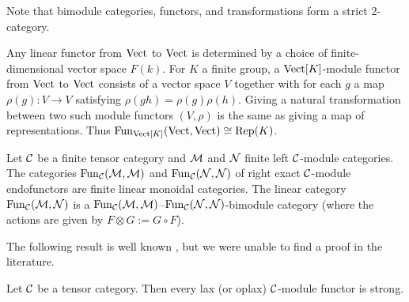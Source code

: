 \documentclass{amsart}
\begin{document}
%
\nid Note that bimodule categories, functors, and transformations form a strict 2-category.  %
 
 


\begin{example}
Any linear functor from $\mathrm{Vect}$ to $\mathrm{Vect}$ is determined by a choice of finite-dimensional vector space $F(k)$.  For $K$ a finite group, a $\mathrm{Vect}[K]$-module functor from $\mathrm{Vect}$ to $\mathrm{Vect}$ consists of a vector space $V$ together with for each $g$ a map $\rho(g): V \rightarrow V$ satisfying $\rho(gh) = \rho(g)\rho(h)$.  Giving a natural transformation between two such module functors $(V, \rho)$ is the same as giving a map of representations.  Thus $\operatorname{Fun}_{\mathrm{Vect}[K]}(\mathrm{Vect}, \mathrm{Vect}) \cong \mathrm{Rep}(K)$.
\end{example}

\begin{example}
	Let $\mathcal C$ be a finite tensor category and $\mathcal M$ and $\mathcal N$ finite left $\mathcal C$-module categories. The categories $\operatorname{Fun}_{\mathcal C}(\mathcal M, \mathcal M)$ and $\operatorname{Fun}_{\mathcal C}(\mathcal N, \mathcal N)$ of right exact $\mathcal C$-module endofunctors are finite linear monoidal categories.   
	The linear category $\operatorname{Fun}_{\mathcal C}(\mathcal M, \mathcal N)$ is a $\operatorname{Fun}_{\mathcal C}(\mathcal M, \mathcal M)$--$\operatorname{Fun}_{\mathcal C}(\mathcal N, \mathcal N)$-bimodule category (where the actions are given by $F \otimes G := G \circ F$). 
\end{example}


The following result is well known \cite[Rmk 4]{MR1976459}, but we were unable to find a proof in the literature.

\begin{lemma} \label{lem:laxisstrong}
	Let $\mathcal C$ be a tensor category. Then every lax (or oplax) $\mathcal C$-module functor is strong.  
\end{lemma}  
\end{document}
